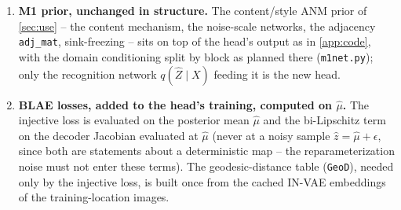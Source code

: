 \begin{enumerate}[label=(\arabic*),leftmargin=2em]
      \textbf{Why this is preferred over editing the module.} The pre/post linear layers are the only
      hand-written, unvalidated pieces; \texttt{AutoencoderKL}'s own encode/decode path and internal
      conv blocks stay exactly as tested and released, with no risk of 
      a silent behavioral change from touching \texttt{quant\_conv}/\texttt{post\_quant\_conv} directly. 
      The cost is one extra pair of thin layers and one more bottleneck seam (module output $\to$ M1
      vector) to account for when tracing where distortion enters the pipeline 
      (\cref{sec:pseudoinj:gotchas}). Because the module's internal variance branch is computed but
      unused in the default mode, its parameters receive no gradient.
\item \textbf{M1 prior, unchanged in structure.} The content/style ANM prior of \cref{sec:use} -- the
      content mechanism, the noise-scale networks, the adjacency \texttt{adj\_mat}, sink-freezing --
      sits on top of the head's output as in \cref{app:code}, with the domain conditioning split by block
      as planned there (\texttt{m1net.py}); only the recognition
      network $q(\hat Z\mid X)$ feeding it is the new head.
\item \textbf{BLAE losses, added to the head's training, computed on $\hat\mu$.} The injective loss
      is evaluated on the posterior mean $\hat\mu$ and the bi-Lipschitz term on the decoder Jacobian
      evaluated at $\hat\mu$ (never at a noisy sample $\hat z=\hat\mu+\epsilon$, since both are
      statements about a deterministic map -- the reparameterization noise must not enter these
      terms). The geodesic-distance table (\texttt{GeoD}), needed only by the injective loss, is
      built once from the cached IN-VAE embeddings of the training-location images.
      

\end{enumerate}
